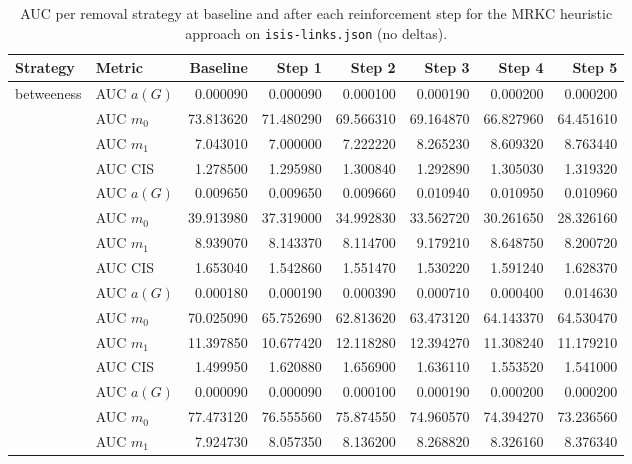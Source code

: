 \begin{table}[htbp]
  \centering
  \caption{AUC per removal strategy at baseline and after each reinforcement step for the MRKC heuristic approach on \texttt{isis-links.json} (no deltas).}
  \label{tab:isis-links-mrkc_heuristic-auc}
  \begin{tabular}{llrrrrrr}
    \toprule
    \textbf{Strategy} & \textbf{Metric} & \textbf{Baseline} & \textbf{Step 1} & \textbf{Step 2} & \textbf{Step 3} & \textbf{Step 4} & \textbf{Step 5} \\
    \midrule
    \multirow{4}{*}{betweeness} & AUC $a(G)$ & 0.000090 & 0.000090 & 0.000100 & 0.000190 & 0.000200 & 0.000200 \\
    & AUC $m_0$ & 73.813620 & 71.480290 & 69.566310 & 69.164870 & 66.827960 & 64.451610 \\
    & AUC $m_1$ & 7.043010 & 7.000000 & 7.222220 & 8.265230 & 8.609320 & 8.763440 \\
    & AUC CIS & 1.278500 & 1.295980 & 1.300840 & 1.292890 & 1.305030 & 1.319320 \\
    \addlinespace
    \multirow{4}{*}{closeness} & AUC $a(G)$ & 0.009650 & 0.009650 & 0.009660 & 0.010940 & 0.010950 & 0.010960 \\
    & AUC $m_0$ & 39.913980 & 37.319000 & 34.992830 & 33.562720 & 30.261650 & 28.326160 \\
    & AUC $m_1$ & 8.939070 & 8.143370 & 8.114700 & 9.179210 & 8.648750 & 8.200720 \\
    & AUC CIS & 1.653040 & 1.542860 & 1.551470 & 1.530220 & 1.591240 & 1.628370 \\
    \addlinespace
    \multirow{4}{*}{core influence} & AUC $a(G)$ & 0.000180 & 0.000190 & 0.000390 & 0.000710 & 0.000400 & 0.014630 \\
    & AUC $m_0$ & 70.025090 & 65.752690 & 62.813620 & 63.473120 & 64.143370 & 64.530470 \\
    & AUC $m_1$ & 11.397850 & 10.677420 & 12.118280 & 12.394270 & 11.308240 & 11.179210 \\
    & AUC CIS & 1.499950 & 1.620880 & 1.656900 & 1.636110 & 1.553520 & 1.541000 \\
    \addlinespace
    \multirow{4}{*}{degree} & AUC $a(G)$ & 0.000090 & 0.000090 & 0.000100 & 0.000190 & 0.000200 & 0.000200 \\
    & AUC $m_0$ & 77.473120 & 76.555560 & 75.874550 & 74.960570 & 74.394270 & 73.236560 \\
    & AUC $m_1$ & 7.924730 & 8.057350 & 8.136200 & 8.268820 & 8.326160 & 8.376340 \\

\end{tabular}
\end{table}
